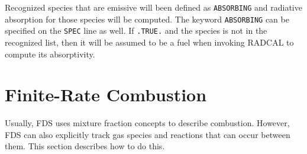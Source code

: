 \documentclass[11pt]{book}
\newcommand{\ct}{\tt\small}
\begin{document}
Recognized species that are emissive will been defined as {\ct ABSORBING} and radiative absorption for those species
will be computed.  The keyword {\ct ABSORBING} can be specified on the {\ct SPEC} line as well.  If {\ct .TRUE.} and the
species is not in the recognized list, then it will be assumed to be a fuel when invoking RADCAL to compute its
absorptivity.

\clearpage

\section{Finite-Rate Combustion}
\label{info:finite}

Usually, FDS uses mixture fraction concepts to describe combustion. However, FDS can also explicitly track gas species and
reactions that can occur between them. This section describes how to do this.
\end{document}
